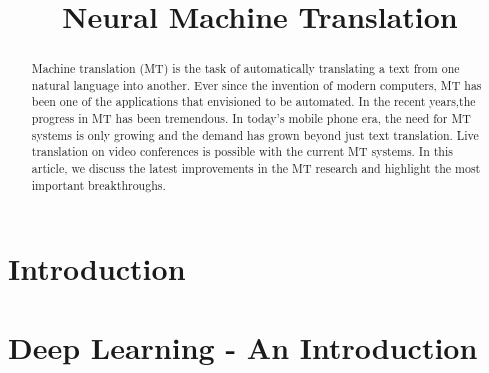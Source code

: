 \documentclass[conference]{IEEEtran}
\begin{document}
\title{Neural Machine Translation}
\vspace{-1.5cm}
\author{
\IEEEauthorblockA{\today}
}

\maketitle


\begin{abstract}
Machine translation (MT) is the task of automatically translating a text from one natural
language into another. Ever since the invention of modern computers, MT has been one of the applications that envisioned to be automated. In the recent years,the progress in MT has been tremendous. In today's mobile phone era, the need for MT systems is only growing and the demand has grown beyond just text translation. Live translation on video conferences is possible with the current MT systems.
In this article, we discuss the latest improvements in the MT research and highlight the most important breakthroughs.
\end{abstract}


\section{Introduction}


\section{Deep Learning - An Introduction}
\end{document}
